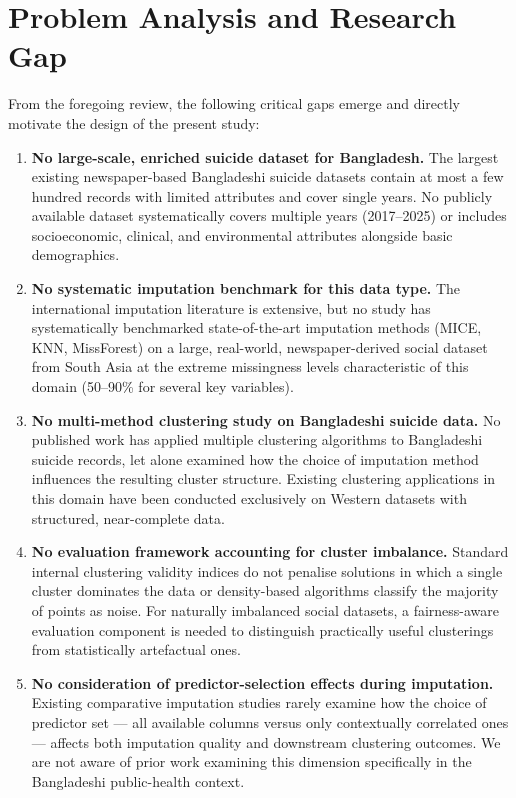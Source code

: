 \section{Problem Analysis and Research Gap}

From the foregoing review, the following critical gaps emerge and directly motivate the design of the present study:

\begin{enumerate}[leftmargin=2em,labelindent=0pt,itemsep=0.4em]
  \item \textbf{No large-scale, enriched suicide dataset for Bangladesh.} The largest existing newspaper-based Bangladeshi suicide datasets contain at most a few hundred records with limited attributes and cover single years. No publicly available dataset systematically covers multiple years (2017--2025) or includes socioeconomic, clinical, and environmental attributes alongside basic demographics.
  \item \textbf{No systematic imputation benchmark for this data type.} The international imputation literature is extensive, but no study has systematically benchmarked state-of-the-art imputation methods (MICE, KNN, MissForest) on a large, real-world, newspaper-derived social dataset from South Asia at the extreme missingness levels characteristic of this domain (50--90\% for several key variables).
  \item \textbf{No multi-method clustering study on Bangladeshi suicide data.} No published work has applied multiple clustering algorithms to Bangladeshi suicide records, let alone examined how the choice of imputation method influences the resulting cluster structure. Existing clustering applications in this domain have been conducted exclusively on Western datasets with structured, near-complete data.
  \item \textbf{No evaluation framework accounting for cluster imbalance.} Standard internal clustering validity indices do not penalise solutions in which a single cluster dominates the data or density-based algorithms classify the majority of points as noise. For naturally imbalanced social datasets, a fairness-aware evaluation component is needed to distinguish practically useful clusterings from statistically artefactual ones.
  \item \textbf{No consideration of predictor-selection effects during imputation.} Existing comparative imputation studies rarely examine how the choice of predictor set --- all available columns versus only contextually correlated ones --- affects both imputation quality and downstream clustering outcomes. We are not aware of prior work examining this dimension specifically in the Bangladeshi public-health context.
\end{enumerate}

